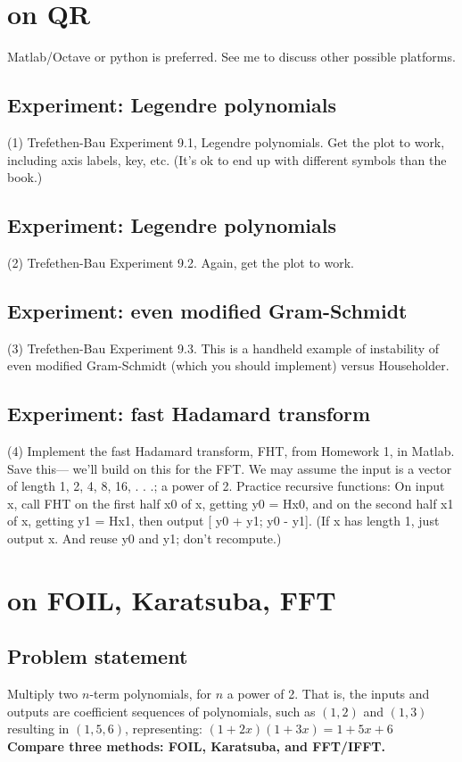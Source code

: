 \documentclass[lang=cn,11pt]{elegantbook}
\begin{document}
\chapter{on QR}
Matlab/Octave or python is preferred. See me to discuss other possible platforms.
\section{Experiment: Legendre polynomials}
(1) Trefethen-Bau Experiment 9.1, Legendre polynomials. Get the plot to work, including axis
labels, key, etc. (It’s ok to end up with different symbols than the book.)


\section{Experiment: Legendre polynomials}
(2) Trefethen-Bau Experiment 9.2. Again, get the plot to work.



\section{Experiment: even modified Gram-Schmidt}
(3) Trefethen-Bau Experiment 9.3. This is a handheld example of instability of even modified
Gram-Schmidt (which you should implement) versus Householder.



\section{Experiment: fast Hadamard transform}
(4) Implement the fast Hadamard transform, FHT, from Homework 1, in Matlab. Save this—
we’ll build on this for the FFT. We may assume the input is a vector of length 1, 2, 4, 8, 16, . . .;
a power of 2. Practice recursive functions: On input x, call FHT on the first half x0 of x,
getting y0 = Hx0, and on the second half x1 of x, getting y1 = Hx1, then output
[ y0 + y1; y0 - y1]. (If x has length 1, just output x. And reuse y0 and y1; don’t
recompute.)







\chapter{on FOIL, Karatsuba, FFT}


\section*{Problem statement}
Multiply two $n$-term polynomials, for $n$ a power of 2. That is, the inputs and outputs are coefficient sequences of polynomials, such as $(1,2)$ and $(1,3)$ resulting in $(1,5,6)$, representing: \( (1 + 2x)(1 + 3x) = 1 + 5x + 6 \) \\
\textbf{Compare three methods: FOIL, Karatsuba, and FFT/IFFT.}
\end{document}
